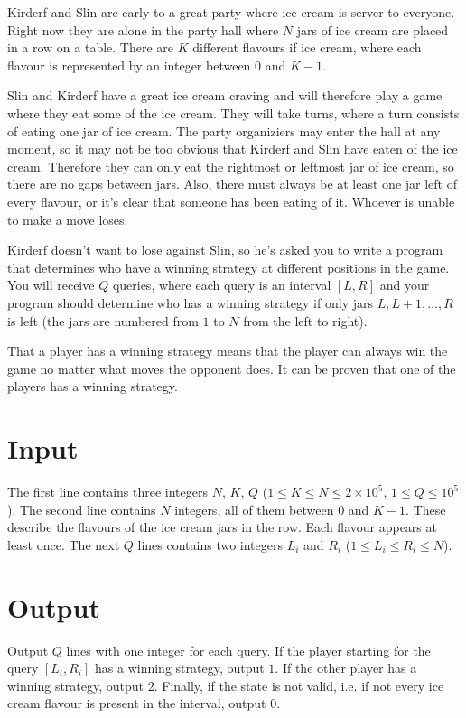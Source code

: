 Kirderf and Slin are early to a great party where ice cream is server to everyone.
Right now they are alone in the party hall where $N$ jars of ice cream are placed in a row on a table.
There are $K$ different flavours if ice cream, where each flavour is represented by an integer between $0$ and $K - 1$.

Slin and Kirderf have a great ice cream craving and will therefore play a game where they eat some of the ice cream.
They will take turns, where a turn consists of eating one jar of ice cream.
The party organiziers may enter the hall at any moment, so it may not be too obvious that Kirderf and Slin have eaten of the ice cream.
Therefore they can only eat the rightmost or leftmost jar of ice cream, so there are no gaps between jars.
Also, there must always be at least one jar left of every flavour, or it's clear that someone has been eating of it.
Whoever is unable to make a move loses.

Kirderf doesn't want to lose against Slin, so he's asked you to write a program that determines who have a winning strategy at different positions in the game.
You will receive $Q$ queries, where each query is an interval $[L, R]$ and your program should determine who has a winning strategy if only jars $L, L + 1, \dots, R$ is left (the jars are numbered from $1$ to $N$ from the left to right).

That a player has a winning strategy means that the player can always win the game no matter what moves the opponent does.
It can be proven that one of the players has a winning strategy.

\section*{Input}
The first line contains three integers $N$, $K$, $Q$ ($1 \le K \le N \le 2 \times 10^5$, $1 \le Q \le 10^5$).
The second line contains $N$ integers, all of them between $0$ and $K - 1$.
These describe the flavours of the ice cream jars in the row.
Each flavour appears at least once.
The next $Q$ lines contains two integers $L_i$ and $R_i$ ($1 \le L_i \le R_i \le N$).

\section*{Output}
Output $Q$ lines with one integer for each query.
If the player starting for the query $[L_i, R_i]$ has a winning strategy, output $1$.
If the other player has a winning strategy, output $2$.
Finally, if the state is not valid, i.e. if not every ice cream flavour is present in the interval, output $0$.


